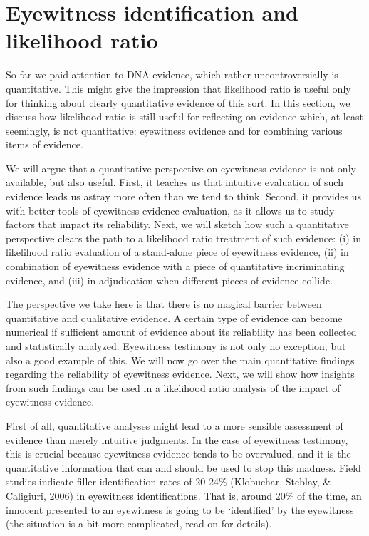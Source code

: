\documentclass[
  10pt,
  dvipsnames,enabledeprecatedfontcommands]{scrartcl}
\begin{document}
\hypertarget{eyewitness-identification-and-likelihood-ratio}{%
\section{\texorpdfstring{Eyewitness identification and likelihood ratio
\label{sec:eyewitness}}{Eyewitness identification and likelihood ratio }}\label{eyewitness-identification-and-likelihood-ratio}}

So far we paid attention to DNA evidence, which rather uncontroversially
is quantitative. This might give the impression that likelihood ratio is
useful only for thinking about clearly quantitative evidence of this
sort. In this section, we discuss how likelihood ratio is still useful
for reflecting on evidence which, at least seemingly, is not
quantitative: eyewitness evidence and for combining various items of
evidence.

We will argue that a quantitative perspective on eyewitness evidence is
not only available, but also useful. First, it teaches us that intuitive
evaluation of such evidence leads us astray more often than we tend to
think. Second, it provides us with better tools of eyewitness evidence
evaluation, as it allows us to study factors that impact its
reliability. Next, we will sketch how such a quantitative perspective
clears the path to a likelihood ratio treatment of such evidence: (i) in
likelihood ratio evaluation of a stand-alone piece of eyewitness
evidence, (ii) in combination of eyewitness evidence with a piece of
quantitative incriminating evidence, and (iii) in adjudication when
different pieces of evidence collide.

The perspective we take here is that there is no magical barrier between
quantitative and qualitative evidence. A certain type of evidence can
become numerical if sufficient amount of evidence about its reliability
has been collected and statistically analyzed. Eyewitness testimony is
not only no exception, but also a good example of this. We will now go
over the main quantitative findings regarding the reliability of
eyewitness evidence. Next, we will show how insights from such findings
can be used in a likelihood ratio analysis of the impact of eyewitness
evidence.

First of all, quantitative analyses might lead to a more sensible
assessment of evidence than merely intuitive judgments. In the case of
eyewitness testimony, this is crucial because eyewitness evidence tends
to be overvalued, and it is the quantitative information that can and
should be used to stop this madness. Field studies indicate filler
identification rates of 20-24\% (Klobuchar, Steblay, \& Caligiuri, 2006)
in eyewitness identifications. That is, around 20\% of the time, an
innocent presented to an eyewitness is going to be `identified' by the
eyewitness (the situation is a bit more complicated, read on for
details).
\end{document}
